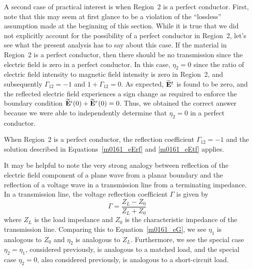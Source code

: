 A second case of practical interest is when Region~2 is a perfect conductor.
First, note that this may seem at first glance to be a violation of the ``lossless'' assumption made at the beginning of this section.
While it is true that we did not explicitly account for the possibility of a perfect conductor in Region~2, let's see what the present analysis has to say about this case.
If the material in Region~2 is a perfect conductor, then there should be no transmission since the electric field is zero in a perfect conductor.
In this case, $\eta_2=0$ since the ratio of electric field intensity to magnetic field intensity is zero in Region~2, and subsequently $\Gamma_{12}=-1$ and $1+\Gamma_{12}=0$.  
As expected, $\widetilde{\bf E}^t$ is found to be zero, and the reflected electric field experiences a sign change as required to enforce the boundary condition $\widetilde{\bf E}^i(0)+\widetilde{\bf E}^r(0)=0$. 
Thus, we obtained the correct answer because we were able to independently determine that $\eta_2=0$ in a perfect conductor.
%
\begin{mdframed}[backgroundcolor=yellow!20,nobreak=true] 
When Region~2 is a perfect conductor, the reflection coefficient $\Gamma_{12}=-1$ and the solution described in Equations~\ref{m0161_eErf} and \ref{m0161_eEtf} applies. 
\end{mdframed}

It may be helpful to note the very strong analogy 
between reflection of the electric field component of a plane wave from a planar boundary and the reflection of a voltage wave in a transmission line from a terminating impedance.  
In a transmission line, the voltage reflection coefficient $\Gamma$ is given by 
%
\begin{equation}
\Gamma = \frac{Z_L-Z_0}{Z_L+Z_0}
\end{equation} 
%
where $Z_L$ is the load impedance and $Z_0$ is the characteristic impedance of the transmission line.
Comparing this to Equation~\ref{m0161_eG}, we see $\eta_1$ is analogous to $Z_0$ and $\eta_2$ is analogous to $Z_L$.
Furthermore, we see the special case $\eta_2=\eta_1$, considered previously, is analogous to a matched load, and
the special case $\eta_2=0$, also considered previously, is analogous to a short-circuit load.

